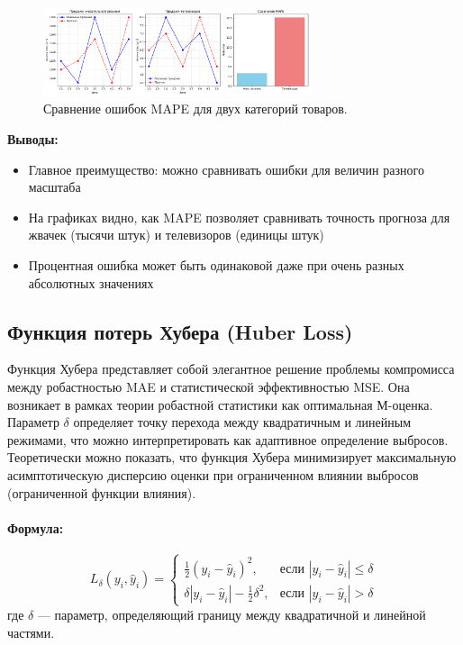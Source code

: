\begin{figure}[h!]
    \centering
    \includegraphics[width=0.7\textwidth]{chapters/general/imgs/mape.png}
    \caption{Сравнение ошибок MAPE для двух категорий товаров.}
    \label{fig:mape_graph}
\end{figure}

\noindent\textbf{Выводы:}
\begin{itemize}
    \item Главное преимущество: можно сравнивать ошибки для величин разного масштаба
    \item На графиках видно, как MAPE позволяет сравнивать точность прогноза для жвачек (тысячи штук) и телевизоров (единицы штук)
    \item Процентная ошибка может быть одинаковой даже при очень разных абсолютных значениях
\end{itemize}


\subsection{Функция потерь Хубера (Huber Loss)}

Функция Хубера представляет собой элегантное решение проблемы компромисса между робастностью MAE и статистической эффективностью MSE. Она возникает в рамках теории робастной статистики как оптимальная М-оценка. Параметр $\delta$ определяет точку перехода между квадратичным и линейным режимами, что можно интерпретировать как адаптивное определение выбросов. Теоретически можно показать, что функция Хубера минимизирует максимальную асимптотическую дисперсию оценки при ограниченном влиянии выбросов (ограниченной функции влияния).

\paragraph{Формула:}
\[
    L_\delta(y_i, \hat{y}_i) =
    \begin{cases}
        \frac{1}{2} (y_i - \hat{y}_i)^2,                 & \text{если } |y_i - \hat{y}_i| \leq \delta \\
        \delta |y_i - \hat{y}_i| - \frac{1}{2} \delta^2, & \text{если } |y_i - \hat{y}_i| > \delta
    \end{cases}
\]
где $\delta$ — параметр, определяющий границу между квадратичной и линейной частями.

